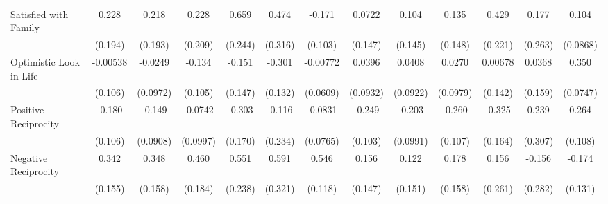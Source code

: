 {\begin{tabular}{l*{12}{c}}
\addlinespace
Satisfied with Family&       0.228         &       0.218         &       0.228         &       0.659\sym{**} &       0.474         &      -0.171         &      0.0722         &       0.104         &       0.135         &       0.429         &       0.177         &       0.104         \\
            &     (0.194)         &     (0.193)         &     (0.209)         &     (0.244)         &     (0.316)         &     (0.103)         &     (0.147)         &     (0.145)         &     (0.148)         &     (0.221)         &     (0.263)         &    (0.0868)         \\
\addlinespace
Optimistic Look in Life&    -0.00538         &     -0.0249         &      -0.134         &      -0.151         &      -0.301\sym{*}  &    -0.00772         &      0.0396         &      0.0408         &      0.0270         &     0.00678         &      0.0368         &       0.350\sym{***}\\
            &     (0.106)         &    (0.0972)         &     (0.105)         &     (0.147)         &     (0.132)         &    (0.0609)         &    (0.0932)         &    (0.0922)         &    (0.0979)         &     (0.142)         &     (0.159)         &    (0.0747)         \\
\addlinespace
Positive Reciprocity&      -0.180         &      -0.149         &     -0.0742         &      -0.303         &      -0.116         &     -0.0831         &      -0.249\sym{*}  &      -0.203\sym{*}  &      -0.260\sym{*}  &      -0.325\sym{*}  &       0.239         &       0.264\sym{*}  \\
            &     (0.106)         &    (0.0908)         &    (0.0997)         &     (0.170)         &     (0.234)         &    (0.0765)         &     (0.103)         &    (0.0991)         &     (0.107)         &     (0.164)         &     (0.307)         &     (0.108)         \\
\addlinespace
Negative Reciprocity&       0.342\sym{*}  &       0.348\sym{*}  &       0.460\sym{*}  &       0.551\sym{*}  &       0.591         &       0.546\sym{***}&       0.156         &       0.122         &       0.178         &       0.156         &      -0.156         &      -0.174         \\
            &     (0.155)         &     (0.158)         &     (0.184)         &     (0.238)         &     (0.321)         &     (0.118)         &     (0.147)         &     (0.151)         &     (0.158)         &     (0.261)         &     (0.282)         &     (0.131)         \\
\bottomrule
\end{tabular}
}
